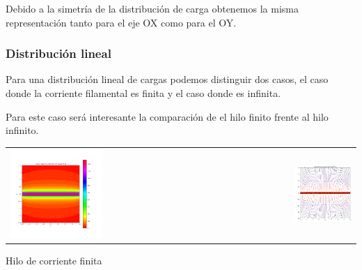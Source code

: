 \documentclass[11pt]{article}
\begin{document}
    Debido a la simetría de la distribución de carga obtenemos la misma representación tanto para el eje OX como para el OY.

    \clearpage

\subsubsection{Distribución lineal}
    \vspace{5mm}Para una distribución lineal de cargas podemos distinguir dos casos, el caso donde la corriente filamental es finita y el caso donde es infinita. 

    \vspace{5mm}Para este caso será interesante la comparación de el hilo finito frente al hilo infinito.

    \vspace{0.8cm}\begin{tabular}{lr}
        \centering
        \includegraphics[width=0.45\textwidth]{finita2.png} &      \includegraphics[width=0.45\textwidth]{finita3.png}
    \end{tabular}
    \vspace{1mm} 
    \begin{center}
     
         Hilo de corriente finita
    \end{center}
    
\end{document}
